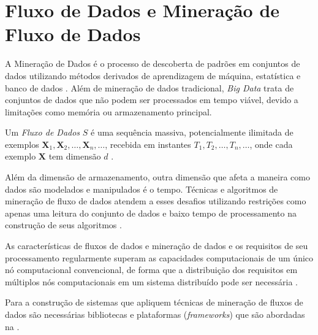 \section{Fluxo de Dados e Mineração de Fluxo de Dados}

A Mineração de Dados é o processo de descoberta de padrões em conjuntos de dados
utilizando métodos derivados de aprendizagem de máquina, estatística e banco de
dados \cite{Gaber2005}.
Além de mineração de dados tradicional, \emph{Big Data} trata de
conjuntos de dados que não podem ser processados em tempo viável, devido a limitações
como memória ou armazenamento principal.

\begin{definition}
  Um \textit{Fluxo de Dados} $S$ é uma sequência massiva, potencialmente
  ilimitada de exemplos $\mathbf{X}_1, \mathbf{X}_2, \dots, \mathbf{X}_n, \dots$,
  recebida em instantes $T_1, T_2, \dots, T_n, \dots$,
  onde cada exemplo $\mathbf{X}$ tem dimensão $d$
  \cite{Aggarwal2003}.
\end{definition}

Além da dimensão de armazenamento, outra dimensão que afeta a maneira como dados
são modelados e manipulados é o tempo.
Técnicas e algoritmos de mineração de fluxo de dados atendem a esses desafios utilizando
restrições como apenas uma leitura do conjunto de dados e baixo tempo de
processamento na construção de seus algoritmos \cite{Gama2007, Gaber2005}.

As características de fluxos de dados e mineração de dados e os requisitos de
seu processamento regularmente superam as capacidades computacionais de um único
nó computacional convencional, de forma que a distribuição dos requisitos em
múltiplos nós computacionais em um sistema distribuído pode ser necessária
\cite{Gaber2005}.


Para a construção de sistemas que apliquem técnicas de mineração de fluxos de
dados são necessárias bibliotecas e plataformas (\emph{frameworks})
que são abordadas na .

